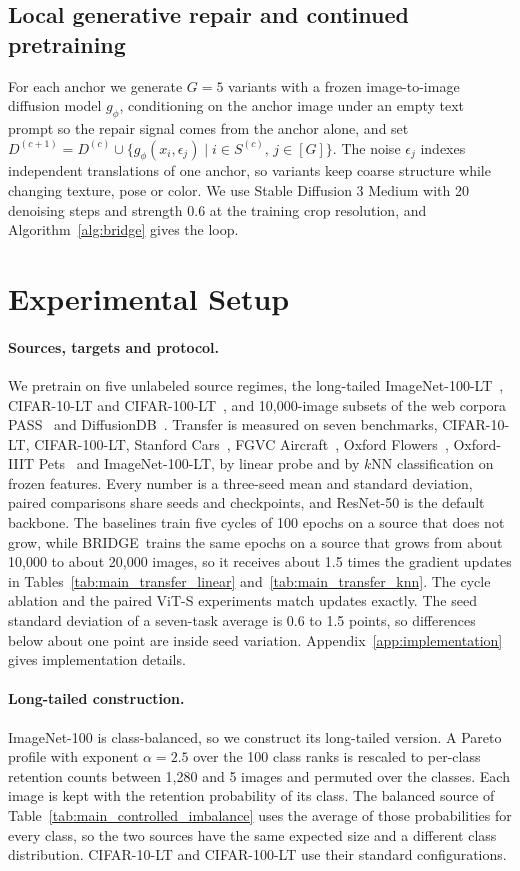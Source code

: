 \documentclass{article}
\newcommand{\method}{BRIDGE}
\begin{document}
\subsection{Local generative repair and continued pretraining}
For each anchor we generate $G=5$ variants with a frozen image-to-image diffusion model $g_\phi$, conditioning on the anchor image under an empty text prompt so the repair signal comes from the anchor alone, and set $D^{(c+1)}=D^{(c)}\cup\{g_\phi(x_i,\epsilon_j)\mid i\in S^{(c)},\,j\in[G]\}$. The noise $\epsilon_j$ indexes independent translations of one anchor, so variants keep coarse structure while changing texture, pose or color. We use Stable Diffusion 3 Medium with 20 denoising steps and strength 0.6 at the training crop resolution, and Algorithm~\ref{alg:bridge} gives the loop.

\section{Experimental Setup}
\label{sec:setup}
\paragraph{Sources, targets and protocol.}
We pretrain on five unlabeled source regimes, the long-tailed ImageNet-100-LT~\citep{imagenet-lt}, CIFAR-10-LT and CIFAR-100-LT~\citep{krizhevsky2009learning}, and 10{,}000-image subsets of the web corpora PASS~\citep{pass} and DiffusionDB~\citep{diffusiondb}. Transfer is measured on seven benchmarks, CIFAR-10-LT, CIFAR-100-LT, Stanford Cars~\citep{cars}, FGVC Aircraft~\citep{aircraft}, Oxford Flowers~\citep{flowers}, Oxford-IIIT Pets~\citep{pets} and ImageNet-100-LT, by linear probe and by $k$NN classification on frozen features. Every number is a three-seed mean and standard deviation, paired comparisons share seeds and checkpoints, and ResNet-50 is the default backbone. The baselines train five cycles of 100 epochs on a source that does not grow, while \method\ trains the same epochs on a source that grows from about 10{,}000 to about 20{,}000 images, so it receives about 1.5 times the gradient updates in Tables~\ref{tab:main_transfer_linear} and~\ref{tab:main_transfer_knn}. The cycle ablation and the paired ViT-S experiments match updates exactly. The seed standard deviation of a seven-task average is 0.6 to 1.5 points, so differences below about one point are inside seed variation. Appendix~\ref{app:implementation} gives implementation details.

\paragraph{Long-tailed construction.}
ImageNet-100 is class-balanced, so we construct its long-tailed version. A Pareto profile with exponent $\alpha=2.5$ over the 100 class ranks is rescaled to per-class retention counts between 1{,}280 and 5 images and permuted over the classes. Each image is kept with the retention probability of its class. The balanced source of Table~\ref{tab:main_controlled_imbalance} uses the average of those probabilities for every class, so the two sources have the same expected size and a different class distribution. CIFAR-10-LT and CIFAR-100-LT use their standard configurations.
\end{document}
